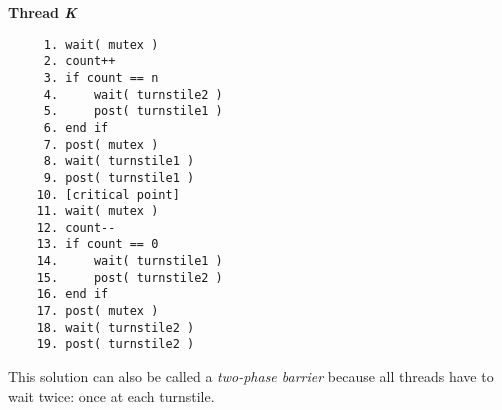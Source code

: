 \textbf{Thread \textit{K}}\vspace{-2em}
\begin{verbatim}
	 1. wait( mutex )
	 2. count++
	 3. if count == n
	 4.     wait( turnstile2 )
	 5.     post( turnstile1 )
	 6. end if
	 7. post( mutex )
	 8. wait( turnstile1 )
	 9. post( turnstile1 )
	10. [critical point]
	11. wait( mutex )
	12. count--
	13. if count == 0
	14.     wait( turnstile1 )
	15.     post( turnstile2 )
	16. end if
	17. post( mutex )
	18. wait( turnstile2 )
	19. post( turnstile2 )
  \end{verbatim}
\vspace{-2em}

This solution can also be called a \textit{two-phase barrier} because all threads have to wait twice: once at each turnstile.





